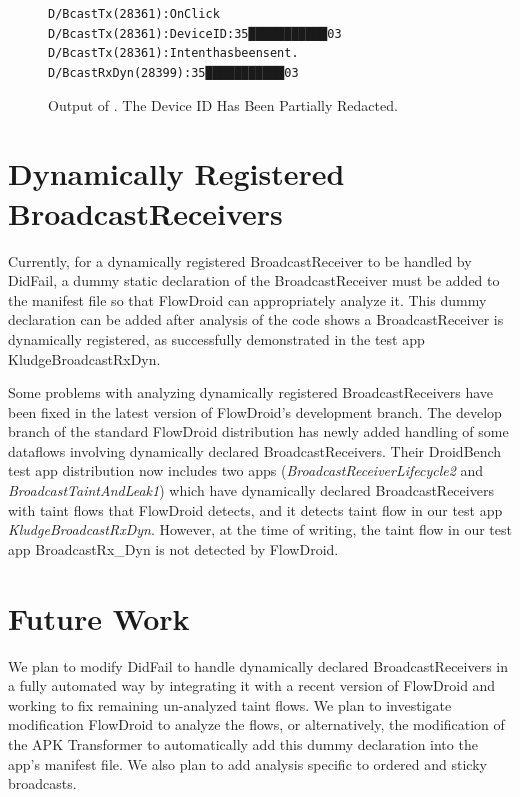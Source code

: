 \begin{figure}[!h]
\begin{framed}
\begin{alltt}
D/BcastTx (28361): OnClick
D/BcastTx (28361): DeviceID: 35███████████03
D/BcastTx (28361): Intent has been sent.
D/BcastRxDyn(28399): 35███████████03
\end{alltt}
\caption[Output of ]{Output of .  The Device ID Has Been Partially Redacted.}
\label{fig:logcat-BcastDyn}
\end{framed}
\end{figure}

\section{Dynamically Registered BroadcastReceivers}
Currently, for a dynamically registered BroadcastReceiver to be handled by DidFail, a dummy static declaration of the BroadcastReceiver must be added to the manifest file so that FlowDroid can appropriately analyze it. This dummy declaration can be added after analysis of the code shows a BroadcastReceiver is dynamically registered, as successfully demonstrated in the test app KludgeBroadcastRxDyn.

Some problems with analyzing dynamically registered BroadcastReceivers have been fixed in the latest version of FlowDroid’s development branch. The develop branch of the standard FlowDroid distribution has newly added handling of some dataflows involving dynamically declared BroadcastReceivers. Their DroidBench test app distribution now includes two apps (\textit{BroadcastReceiverLifecycle2} and \textit{BroadcastTaintAndLeak1}) which have dynamically declared BroadcastReceivers with taint flows that FlowDroid detects, and it detects taint flow in our test app \textit{KludgeBroadcastRxDyn}. However, at the time of writing, the taint flow in our test app BroadcastRx\_Dyn is not detected by FlowDroid.

\section{Future Work}
We plan to modify DidFail to handle dynamically declared BroadcastReceivers in a fully automated way by integrating it with a recent version of FlowDroid and working to fix remaining un-analyzed taint flows. We plan to investigate modification FlowDroid to analyze the flows, or alternatively, the modification of the APK Transformer to automatically add this dummy declaration into the app’s manifest file. We also plan to add analysis specific to ordered and sticky broadcasts.


